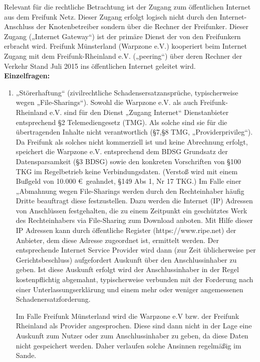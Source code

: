 \documentclass{article}
\begin{document}
Relevant für die rechtliche Betrachtung ist der Zugang zum öffentlichen Internet aus dem Freifunk Netz. Dieser Zugang erfolgt logisch nicht durch den Internet-Anschluss der Knotenbetreiber sondern über die Rechner der Freifunker. Dieser Zugang („Internet Gateway“) ist der primäre Dienst der von den Freifunkern erbracht wird. Freifunk  Münsterland (Warpzone e.V.) kooperiert beim Internet Zugang mit dem Freifunk-Rheinland e.V. („peering“)  über deren Rechner der Verkehr Stand Juli 2015 ins öffentlichen Internet geleitet wird.\bigskip\\

\textbf{Einzelfragen:}

\begin{enumerate}\item  „Störerhaftung“ (zivilrechtliche Schadensersatzansprüche, typischerweise wegen „File-Sharings“).
Sowohl die Warpzone e.V. als auch Freifunk-Rheinland e.V. sind für den Dienst „Zugang Internet“ Dienstanbieter entsprechend §2 Telemediengesetz (TMG).  Als solche sind sie für die übertragenden Inhalte nicht verantwortlich (§7,§8 TMG, „Providerprivileg“). Da Freifunk als solches nicht kommerziell ist und keine Abrechnung erfolgt, speichert die Warpzone e.V. entsprechend dem BDSG Grundsatz der Datensparsamkeit (§3 BDSG) sowie den konkreten Vorschriften von §100 TKG im Regelbetrieb keine Verbindungsdaten. (Verstoß wird mit einem Bußgeld von 10.000 \euro\ geahndet, §149 Abs 1, Nr 17 TKG.) Im Falle einer „Abmahnung wegen File-Sharings werden durch den Rechteinhaber  häufig Dritte beauftragt diese festzustellen. Dazu werden die Internet (IP) Adressen von Anschlüssen festgehalten, die zu einem Zeitpunkt ein geschütztes Werk des Rechteinhabers via File-Sharing zum Download anboten. Mit Hilfe dieser IP Adressen kann durch öffentliche Register (https://www.ripe.net) der Anbieter, dem diese Adresse zugeordnet ist, ermittelt werden. Der entsprechende   Internet Service Provider wird dann (zur Zeit üblicherweise per Gerichtsbeschluss) aufgefordert  Auskunft über den Anschlussinhaber zu geben. Ist diese Auskunft erfolgt wird der Anschlussinhaber in der Regel kostenpflichtig abgemahnt, typischerweise verbunden mit der Forderung nach einer Unterlassungserklärung und einem mehr oder weniger angemessenen Schadenersatzforderung.

Im Falle Freifunk Münsterland wird die Warpzone e.V bzw. der Freifunk Rheinland als Provider angesprochen. Diese sind dann nicht in der Lage eine Auskunft zum Nutzer oder zum Anschlussinhaber zu geben, da diese Daten nicht gespeichert werden. Daher verlaufen solche Ansinnen regelmäßig im Sande.


\end{enumerate}
\end{document}
